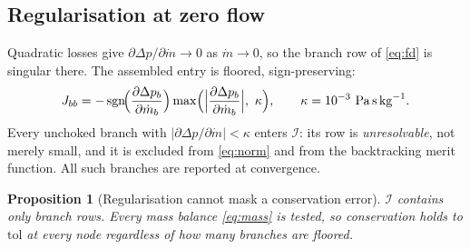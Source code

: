 \documentclass[11pt,a4paper]{article}
\newtheorem{proposition}{Proposition}
\newcommand{\mdot}{\dot{m}}
\newcommand{\dd}[2]{\frac{\partial #1}{\partial #2}}
\begin{document}
\subsection{Regularisation at zero flow}\label{sec:regular}
Quadratic losses give $\partial\Delta p/\partial\mdot\to 0$ as $\mdot\to0$, so
the branch row of \cref{eq:fd} is singular there. The assembled entry is
floored, sign-preserving:
\begin{equation}
  J_{bb} = -\operatorname{sgn}\!\Bigl(\dd{\Delta p_b}{\mdot_b}\Bigr)
           \max\Bigl(\Bigl|\dd{\Delta p_b}{\mdot_b}\Bigr|,\ \kappa\Bigr),
  \qquad \kappa = 10^{-3}\ \si{\pascal\second\per\kilogram}.
\end{equation}
Every unchoked branch with $|\partial\Delta p/\partial\mdot|<\kappa$ enters
$\mathcal{I}$: its row is \emph{unresolvable}, not merely small, and it is
excluded from \cref{eq:norm} and from the backtracking merit function. All such
branches are reported at convergence.

\begin{proposition}[Regularisation cannot mask a conservation error]
$\mathcal{I}$ contains only branch rows. Every mass balance \cref{eq:mass} is
tested, so conservation holds to $\mathrm{tol}$ at every node regardless of how
many branches are floored.
\end{proposition}
\end{document}

